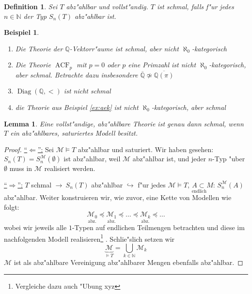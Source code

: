 \documentclass[a4paper,12pt,numbers=noenddot,parskip=full]{scrartcl}
\newcommand{\setN}{\mathbb{N}}
\newcommand{\setQ}{\mathbb{Q}}
\newcommand{\scrM}{\mathcal{M}}
\DeclareMathOperator{\Diag}{Diag}
\DeclareMathOperator{\acf}{ACF}
\theoremstyle{dotless}
\newtheorem{lemma}[theorem]{Lemma}
\newtheorem{definition}[theorem]{Definition}
\newtheorem{example}[theorem]{Beispiel}
\begin{document}
\begin{definition}
	Sei $T$ abz"ahlbar und vollst"andig. $T$ ist schmal, falls f"ur jedes $n \in \setN$ der Typ $S_n(T)$ abz"ahlbar ist.
\end{definition}
\begin{example}
	\begin{enumerate}
		\item Die Theorie der $\setQ$-Vektorr"aume ist schmal, aber nicht $\aleph_0$-kategorisch
		\item Die Theorie $\acf_p$ mit $p=0$ oder $p$ eine Primzahl ist nicht $\aleph_0$-kategorisch, aber schmal. Betrachte dazu insbesondere $\overline{\setQ} \not\simeq \overline{\setQ(\pi)}$
		\item $\Diag(\setQ, <)$ ist nicht schmal
		\item die Theorie aus Beispiel \ref{ex:aek} ist nicht $\aleph_0$-kategorisch, aber schmal
	\end{enumerate}
\end{example}
\begin{lemma}
	Eine vollst"andige, abz"ahlbare Theorie ist genau dann schmal, wenn $T$ ein abz"ahlbares, saturiertes Modell besitzt.
\end{lemma}
\begin{proof}
	\underline{"`$\Leftarrow$"':} Sei $\scrM \models T$ abz"ahlbar und saturiert. Wir haben gesehen: $S_n(T) = S_n^\scrM(\emptyset)$ ist abz"ahlbar, weil $\scrM$ abz"ahlbar ist, und jeder $n$-Typ "uber $\emptyset$ muss in $\scrM$ realisiert werden.
	
	\underline{"`$\Rightarrow$"':} $T$ schmal $\rightarrow~ S_n(T)$ abz"ahlbar $\hookrightarrow$ f"ur jedes $\scrM \models T$, $\underset{\text{endlich}}{A \subset} M$: $S_n^\scrM(A)$ abz"ahlbar. Weiter konstruieren wir, wie zuvor, eine Kette von Modellen wie folgt:
	\begin{equation*}
		\underset{\text{abz.}}{\scrM_0} \preceq \underset{\text{abz.}}{\scrM_1} \preceq \dots \preceq \underset{\text{abz.}}{\scrM_k} \preceq \dots
	\end{equation*}
	wobei wir jeweils alle $1$-Typen auf endlichen Teilmengen betrachten und diese im nachfolgenden Modell realisieren\footnote{Vergleiche dazu auch "Ubung xyz}%
	. Schlie"slich setzen wir
	\begin{equation*}
		\underbrace{\scrM}_{\models T} = \bigcup\limits_{k \in \setN} \scrM_k
	\end{equation*}
	$\scrM$ ist als abz"ahlbare Vereinigung abz"ahlbarer Mengen ebenfalls abz"ahlbar.
\end{proof}
\end{document}
